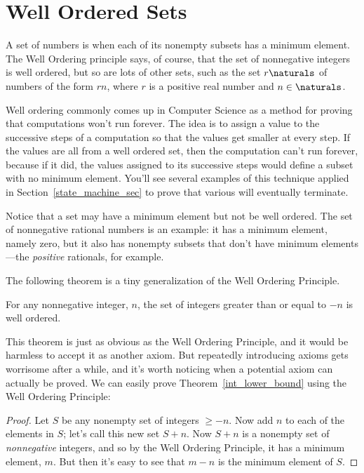 \section{Well Ordered Sets}\label{well_ordering_sec}

A set of numbers is  when each of its nonempty
subsets has a minimum element.  The Well Ordering principle says, of
course, that the set of nonnegative integers is well ordered, but so
are lots of other sets, such as the set $r\naturals$ of numbers
of the form $rn$, where $r$ is a positive real number and $n \in
\naturals$.

Well ordering commonly comes up in Computer Science as a method for
proving that computations won't run forever.  The idea is to assign a
value to the successive steps of a computation so that the values get
smaller at every step.  If the values are all from a well ordered set,
then the computation can't run forever, because if it did, the values
assigned to its successive steps would define a subset with no minimum
element.  You'll see several examples of this technique applied in
Section~\ref{state_machine_sec} to prove that various  will eventually terminate.

Notice that a set may have a minimum element but not be well ordered.
The set of nonnegative rational numbers is an example: it has a
minimum element, namely zero, but it also has nonempty subsets that
don't have minimum elements---the \emph{positive} rationals, for
example.

The following theorem is a tiny generalization of the Well Ordering
Principle.

\begin{theorem}\label{int_lower_bound}
For any nonnegative integer, $n$, the set of integers greater than or equal to $-n$
is well ordered.
\end{theorem}

This theorem is just as obvious as the Well Ordering Principle, and it
would be harmless to accept it as another axiom.  But repeatedly
introducing axioms gets worrisome after a while, and it's worth
noticing when a potential axiom can actually be proved.  We can easily
prove Theorem~\ref{int_lower_bound} using the Well Ordering Principle:

\begin{proof}
Let $S$ be any nonempty set of integers $\geq -n$.  Now add $n$ to
each of the elements in $S$; let's call this new set $S+n$.  Now $S+n$
is a nonempty set of \emph{nonnegative} integers, and so by the Well
Ordering Principle, it has a minimum element, $m$.  But then it's easy
to see that $m - n$ is the minimum element of $S$.
\end{proof}


